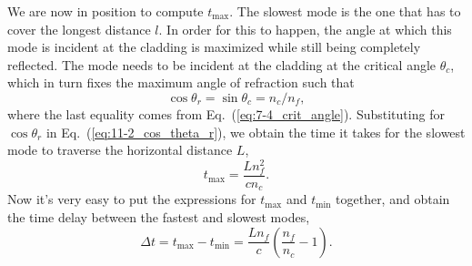 We are now in position to compute $t_{\max}$.
The slowest mode is the one that has to cover the longest distance $l$.
In order for this to happen, the angle at which this mode is incident at the cladding is maximized while still being completely reflected.
The mode needs to be incident at the cladding at the critical angle $\theta_c$, which in turn fixes the maximum angle of refraction such that
\begin{equation}
    \cos\theta_r = \sin\theta_c = n_c / n_f,
    \label{eq:11-2_cos_theta_r}
\end{equation}
where the last equality comes from Eq.~(\ref{eq:7-4_crit_angle}).
Substituting for $\cos\theta_r$ in Eq.~(\ref{eq:11-2_cos_theta_r}), we obtain the time it takes for the slowest mode to traverse the horizontal distance $L$,
\begin{equation}
    t_{\max }=\frac{L n_f^2}{c n_c}.
\end{equation}
Now it's very easy to put the expressions for $t_{\mathrm{max}}$ and $t_{\mathrm{min}}$ together, and obtain the time delay between the fastest and slowest modes, 
\begin{equation}
    \Delta t = t_{\max} - t_{\min} = \frac{L n_f}{c}\left(\frac{n_f}{n_c}-1\right).
    \label{eq:11-2_time_delay}
\end{equation}

